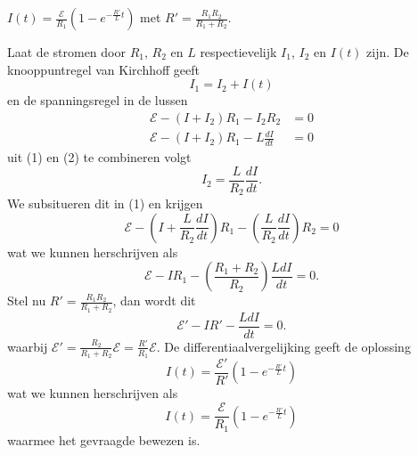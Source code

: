 \begin{description}[labelwidth=1.5cm, leftmargin=!]
    \item[TB. :] $I(t) = \frac{\mathcal{E}}{R_1} \left( 1 - e^{-\tfrac{R'}{L}t} \right)$ met $R' = \frac{R_1R_2}{R_1 + R_2}$.
    \item[B. :]
        Laat de stromen door $R_1$, $R_2$ en $L$ respectievelijk $I_1$, $I_2$ en $I(t)$ zijn. De knooppuntregel van Kirchhoff geeft
        \begin{equation*}
            I_1 = I_2 + I(t)
        \end{equation*}
        en de spanningsregel in de lussen
        \begin{align}
            \mathcal{E} - (I + I_2)R_1 - I_2R_2 &= 0 \\
            \mathcal{E} - (I + I_2)R_1 -L\frac{dI}{dt} &= 0
        \end{align}
        uit (1) en (2) te combineren volgt
        \begin{equation*}
            I_2 = \frac{L}{R_2} \frac{dI}{dt}.
        \end{equation*}
        We subsitueren dit in (1) en krijgen
        \begin{equation*}
            \mathcal{E} - \left(I + \frac{L}{R_2} \frac{dI}{dt} \right)R_1 - \left(\frac{L}{R_2} \frac{dI}{dt}\right)R_2 = 0 
        \end{equation*}
        wat we kunnen herschrijven als
        \begin{equation*}
            \mathcal{E} - IR_1 - \left(\frac{R_1 + R_2 }{R_2} \right)\frac{LdI}{dt} = 0.
        \end{equation*}
        Stel nu $R' = \frac{R_1R_2}{R_1 + R_2}$, dan wordt dit
        \begin{equation*}
            \mathcal{E}' - IR' - \frac{LdI}{dt} = 0.
        \end{equation*}
        waarbij $\mathcal{E}' = \frac{R_2}{R_1+R_2}\mathcal{E} = \frac{R'}{R_1}\mathcal{E}$. De differentiaalvergelijking geeft de oplossing
        \begin{equation*}
            I(t) = \frac{\mathcal{E}'}{R'} \left( 1 - e^{-\tfrac{R'}{L}t} \right)
        \end{equation*}
        wat we kunnen herschrijven als
        \begin{equation*}
            I(t) = \frac{\mathcal{E}}{R_1} \left( 1 - e^{-\tfrac{R'}{L}t} \right)
        \end{equation*}
        waarmee het gevraagde bewezen is.
\end{description}


\vspace{1cm}